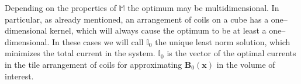 
 Depending on the properties of $\mathbb{M}$ the optimum may be multidimensional. In particular, as already mentioned, an arrangement of coils on a cube has a one--dimensional kernel, which will always cause the optimum to be at least a one--dimensional. In these cases we will call $\mathbb{I}_0$ the unique least norm solution, which minimizes the total current in the system. $\mathbb{I}_0$ is the vector of the optimal currents in the tile arrangement of coils for approximating $\mathbf{B}_0(\mathbf{x})$ in the volume of interest.

